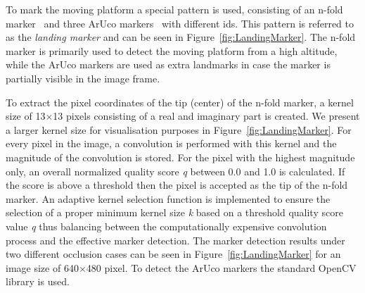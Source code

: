 \documentclass[conference]{IEEEtran}
\begin{document}

To mark the moving platform a special pattern is used,
consisting of an n-fold marker~\cite{NfoldMarker} and three
ArUco markers~\cite{ArUco_marker} with different ids. This pattern
is referred to as the \emph{landing marker} and can be seen in
Figure~\ref{fig:LandingMarker}. The n-fold marker is primarily used to
detect the moving platform from a high altitude, while the ArUco
markers are used as extra landmarks in case the marker is partially
visible in the image frame.



To extract the pixel coordinates of the tip (center) of the n-fold marker, a
kernel size of \SI{13}{}$\times$\SI{13}{} pixels consisting of a real and imaginary
part is created. We present a larger kernel size for visualisation purposes in Figure~\ref{fig:LandingMarker}.   For every pixel in the image, a convolution is
performed with this kernel and the magnitude of the convolution is
stored. 
For the pixel with the highest magnitude only, 
an
overall normalized quality score \emph{q} between \SI{0.0}{} and \SI{1.0}{} is calculated. If
the score is above a threshold then the pixel is
accepted as the tip of the n-fold marker. 
%
An adaptive kernel selection function is implemented to ensure the selection of a
proper minimum kernel size \emph{k} based on a threshold quality score value \emph{q} thus balancing between the computationally expensive convolution process and the effective marker detection. The marker detection results under two different occlusion cases can be seen in Figure~\ref{fig:LandingMarker} for an image size of \SI{640}{}$\times$\SI{480}{} pixel.
%
To detect the ArUco markers the standard OpenCV library is used. %
\end{document}

